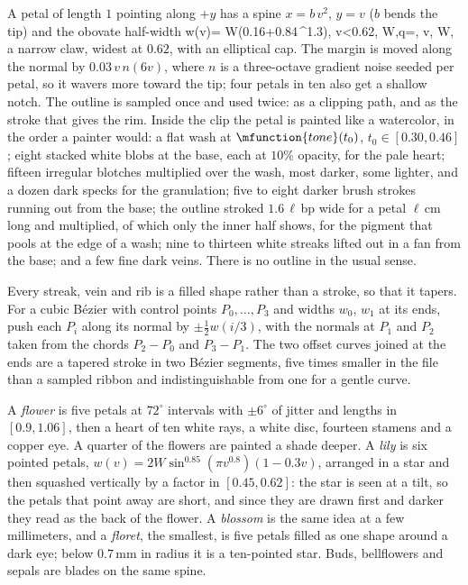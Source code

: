\startconstruction[title={Petal}]
A petal of length $1$ pointing along $+y$ has a spine $x=b\,v^2$, $y=v$ ($b$ bends the
tip) and the obovate half-width
\startformula
  w(v)=\startcases
    \NC W\bigl(0.16+0.84\,\sin^{1.3}\bigr), \NC v<0.62,\NR
    \NC W,\quad q=, \NC v,\NR
  \stopcases
  \qquad W\in[0.40,0.48],
\stopformula
a narrow claw, widest at $0.62$, with an elliptical cap. The margin is moved along the
normal by $0.03\,v\,n(6v)$, where $n$ is a three-octave gradient noise seeded per petal, so
it wavers more toward the tip; four petals in ten also get a shallow notch. The outline is
sampled once and used twice: as a clipping path, and as the stroke that gives the rim.
Inside the clip the petal is painted like a watercolor, in the order a painter would: a
flat wash at $\mfunction{tone}(t_0)$, $t_0\in[0.30,0.46]$; eight stacked white blobs at
the base, each at $10\%$ opacity, for the pale heart; fifteen irregular blotches
multiplied over the wash, most darker, some lighter, and a dozen dark specks for the
granulation; five to eight darker brush strokes running out from the base; the outline
stroked $1.6\,\ell$\,bp wide for a petal $\ell$\,cm long and multiplied, of which only the
inner half shows, for the pigment that pools at the edge of a wash; nine to thirteen white
streaks lifted out in a fan from the base; and a few fine dark veins. There is no outline
in the usual sense.
\stopconstruction

\startconstruction[title={Tapered strokes}]
Every streak, vein and rib is a filled shape rather than a stroke, so that it tapers. For a
cubic Bézier with control points $P_0,\dots,P_3$ and widths $w_0$, $w_1$ at its ends, push
each $P_i$ along its normal by $\pm\frac12 w(i/3)$, with the normals at $P_1$ and $P_2$ taken
from the chords $P_2-P_0$ and $P_3-P_1$. The two offset curves joined at the ends are a
tapered stroke in two Bézier segments, five times smaller in the file than a sampled
ribbon and indistinguishable from one for a gentle curve.
\stopconstruction

\startconstruction[title={Flowers}]
A \emph{flower} is five petals at $72^\circ$ intervals with $\pm6^\circ$ of jitter and lengths
in $[0.9,1.06]$, then a heart of ten white rays, a white disc, fourteen stamens and a copper
eye. A quarter of the flowers are painted a shade deeper. A \emph{lily} is six pointed petals,
$w(v)=2W\sin^{0.85}(\pi v^{0.8})(1-0.3v)$, arranged in a star and then squashed
vertically by a factor in $[0.45,0.62]$: the star is seen at a tilt, so the petals that point
away are short, and since they are drawn first and darker they read as the back of the
flower. A \emph{blossom} is the same idea at a few millimeters, and a \emph{floret}, the
smallest, is five petals filled as one shape around a dark eye; below $0.7$\,mm in radius it
is a ten-pointed star. Buds, bellflowers and sepals are blades on the same spine.
\stopconstruction


